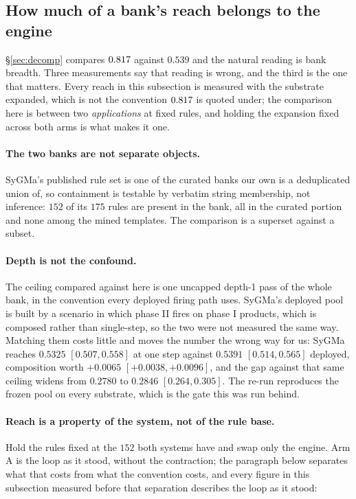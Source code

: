 \subsection{How much of a bank's reach belongs to the engine}
\label{app:enginereach}

\S\ref{sec:decomp} compares $0.817$ against $0.539$ and the natural reading is bank breadth. Three
measurements say that reading is wrong, and the third is the one that matters. Every reach in this
subsection is measured with the substrate expanded, which is not the convention $0.817$ is quoted
under; the comparison here is between two \emph{applications} at fixed rules, and holding the
expansion fixed across both arms is what makes it one.

\paragraph{The two banks are not separate objects.} SyGMa's published rule set is one of the curated
banks our own is a deduplicated union of, so containment is testable by verbatim string membership, not inference: $152$ of its $175$ rules are present in the bank, all in the
curated portion and none among the mined templates. The comparison is a superset against a subset.

\paragraph{Depth is not the confound.} The ceiling compared against here is one uncapped depth-1
pass of the whole bank, in the convention every deployed firing path uses. SyGMa's deployed
pool is built by a scenario in which phase II fires on phase I products, which is composed rather
than single-step, so the two were not measured the same way. Matching them costs little and moves
the number the wrong way for us: SyGMa reaches $0.5325$ $[0.507,0.558]$ at one step against $0.5391$
$[0.514,0.565]$ deployed, composition worth $+0.0065$ $[+0.0038,+0.0096]$, and the gap against that
same ceiling widens from $0.2780$ to $0.2846$ $[0.264,0.305]$. The re-run reproduces the frozen pool on every
substrate, which is the gate this was run behind.

\paragraph{Reach is a property of the system, not of the rule base.} Hold the rules fixed at the
$152$ both systems have and swap only the engine. Arm A is the loop as it stood, without the
contraction; the paragraph below separates what that costs from what the convention costs, and every
figure in this subsection measured before that separation describes the loop as it stood:

